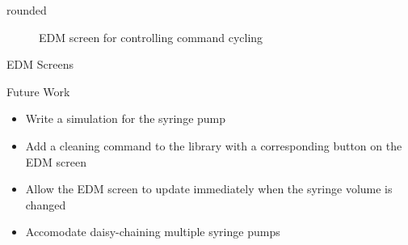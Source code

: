 \documentclass[a0paper,landscape,fontscale=0.35]{baposter}
\begin{document}
\begin{poster}
\begin{posterbox}[name=edmimage,column=3,headerfont={},headershape=rounded,boxheaderheight=0em,boxColorOne=white,borderColor=white]{rounded}
\begin{figure}[H]
\begin{center}
\caption{EDM screen for controlling command cycling}
\end{center}
\end{figure}
\end{posterbox}
\begin{posterbox}[name=edmscreenexp,column=3,below=edmimage]{EDM Screens}
\end{posterbox}
\begin{posterbox}[name=futurework,column=3,above=bottom]{Future Work}
 \begin{itemize}
    \item Write a simulation for the syringe pump
    \item Add a cleaning command to the library with a corresponding button on the EDM screen
    \item Allow the EDM screen to update immediately when the syringe volume is changed
    \item Accomodate daisy-chaining multiple syringe pumps
\end{itemize}
\end{posterbox}

\end{poster}
\end{document}
